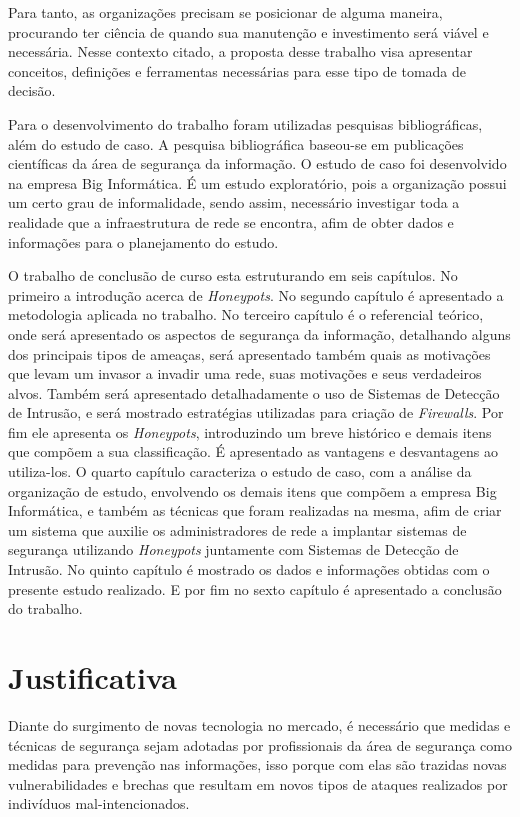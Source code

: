 Para tanto, as organizações precisam se posicionar de alguma maneira, procurando ter ciência de quando sua manutenção e investimento será viável e necessária. Nesse contexto citado, a proposta desse trabalho visa apresentar conceitos, definições e ferramentas necessárias para esse tipo de tomada de decisão.

Para o desenvolvimento do trabalho foram utilizadas pesquisas bibliográficas, além do estudo de caso. A pesquisa bibliográfica baseou-se em publicações científicas da área de segurança da informação. O estudo de caso foi desenvolvido na empresa Big Informática. É um estudo exploratório, pois a organização possui um certo grau de informalidade, sendo assim, necessário investigar toda a realidade que a infraestrutura de rede se encontra, afim de obter dados e informações para o planejamento do estudo.

O trabalho de conclusão de curso esta estruturando em seis capítulos. No primeiro a introdução acerca de \textit{Honeypots}. No segundo capítulo é apresentado a metodologia aplicada no trabalho. No terceiro capítulo é o referencial teórico, onde será apresentado os aspectos de segurança da informação, detalhando alguns dos principais tipos de ameaças, será apresentado também quais as motivações que levam um invasor a invadir uma rede, suas motivações e seus verdadeiros alvos. Também será apresentado detalhadamente o uso de Sistemas de Detecção de Intrusão, e será mostrado estratégias utilizadas para criação de \textit{Firewalls}. Por fim ele apresenta os \textit{Honeypots}, introduzindo um breve histórico e demais itens que compõem a sua classificação. É apresentado as vantagens e desvantagens ao utiliza-los. O quarto capítulo caracteriza o estudo de caso, com a análise da organização de estudo, envolvendo os demais itens que compõem a empresa Big Informática, e também as técnicas que foram realizadas na mesma, afim de criar um sistema que auxilie os administradores de rede a implantar sistemas de segurança utilizando \textit{Honeypots} juntamente com Sistemas de Detecção de Intrusão. No quinto capítulo é mostrado os dados e informações obtidas com o presente estudo realizado. E por fim no sexto capítulo é apresentado a conclusão do trabalho.

\section{Justificativa}
Diante do surgimento de novas tecnologia no mercado, é necessário que medidas e técnicas de segurança sejam adotadas por profissionais da área de segurança como medidas para prevenção nas informações, isso porque com elas são trazidas novas vulnerabilidades e brechas que resultam em novos tipos de ataques realizados por indivíduos mal-intencionados.


